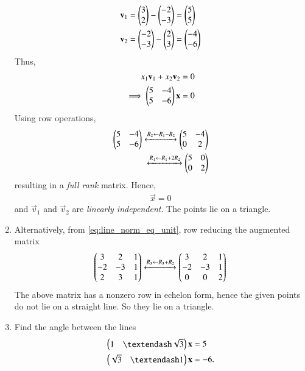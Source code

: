 \begin{enumerate}[label=\thesubsection.\arabic*.,ref=\thesubsection.\theenumi]
\begin{align}
\mathbf{v}_1 &= \begin{pmatrix}3\\2\end{pmatrix}-\begin{pmatrix}-2\\-3\end{pmatrix}=\begin{pmatrix}5\\5\end{pmatrix}
\\
\mathbf{v}_2 &= \begin{pmatrix}-2\\-3\end{pmatrix}-\begin{pmatrix}2\\3\end{pmatrix} = \begin{pmatrix}-4\\-6\end{pmatrix}
\end{align}
Thus,
\begin{align}
\label{eq:lin_indep}
x_1\mathbf{v}_1+x_2\mathbf{v}_2 &= 0 
\\
\implies \begin{pmatrix}5 & -4 \\ 5 & -6\end{pmatrix}\mathbf{x} & = 0
\end{align}
Using row operations,
\begin{align}
\begin{pmatrix}5 & -4\\ 5 & -6\end{pmatrix}
\xleftrightarrow[]{R_2\leftarrow R_1-R_2}
\begin{pmatrix}5 & -4\\ 0 & 2\end{pmatrix}
\\
\xleftrightarrow[]{R_1\leftarrow R_1+2R_2}
\begin{pmatrix}5 & 0\\ 0 & 2\end{pmatrix}
\end{align}
resulting in a {\em full rank} matrix.  Hence, 
\begin{align}
 \vec{x} = 0
 \end{align}
and $\vec{v}_1$ and $\vec{v}_2$ are {\em linearly independent}.  The points lie on a triangle.
\item Alternatively, from \eqref{eq:line_norm_eq_unit}, row reducing the augmented matrix
\begin{align}
\begin{pmatrix}3&2 & 1\\ -2&-3 & 1\\ 2&3 & 1\end{pmatrix} \xleftrightarrow[]{R_3\leftarrow R_3+R_2}
\begin{pmatrix}3&2 & 1\\ -2&-3 & 1\\ 0&0 & 2\end{pmatrix}
\end{align}
The above matrix has a nonzero row in echelon form, hence the given points
do not lie on a straight line.  So they lie on a triangle.
\item  Find the angle between the lines 
%
\begin{align}
\begin{split}
\myvec{1 & – \sqrt{3}}\vec{x}  &= 5
\\
\myvec{\sqrt{3} & –1}\vec{x}  &= -6. 
\end{split}
\label{eq:inner_prod_prob}
\end{align}
\\
\solution

\end{enumerate}
